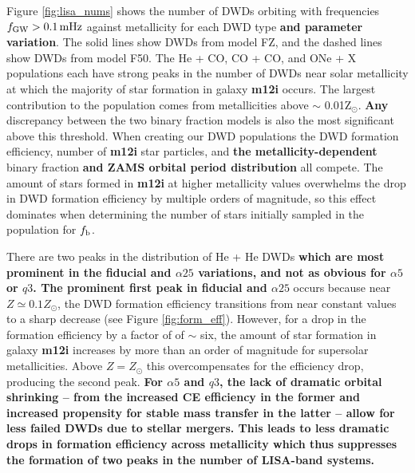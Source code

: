 \documentclass[twocolumn, linenumbers]{aastex631}
\begin{document}
Figure \ref{fig:lisa_nums} shows the number of DWDs orbiting with frequencies $f_{\rm{GW}} > 0.1\,\rm{mHz}$ against metallicity for each DWD type \textbf{and parameter variation}. The solid lines show DWDs from model FZ, and the dashed lines show DWDs from model F50. The He + CO, CO + CO, and ONe + X populations each have strong peaks in the number of DWDs near solar metallicity at which the majority of star formation in galaxy {\bf{m12i}} occurs. The largest contribution to the population comes from metallicities above $\sim$ 0.01Z$_\odot$. \textbf{Any} discrepancy between the two binary fraction models is also the most significant above this threshold. When creating our DWD populations the DWD formation efficiency, number of \textbf{m12i} star particles, and \textbf{the metallicity-dependent} binary fraction \textbf{and ZAMS orbital period distribution} all compete. The amount of stars formed in \textbf{m12i} at higher metallicity values overwhelms the drop in DWD formation efficiency by multiple orders of magnitude, so this effect dominates when determining the number of stars initially sampled in the population for $f_{\rm{b}}$. 

There are two peaks in the distribution of He + He DWDs \textbf{which are most prominent in the fiducial and $\alpha25$ variations, and not as obvious for $\alpha5$ or $q3$. The prominent first peak in fiducial and $\alpha25$} occurs because near $Z\simeq 0.1Z_\odot$, the DWD formation efficiency transitions from near constant values to a sharp decrease (see Figure \ref{fig:form_eff}). However, for a drop in the formation efficiency by a factor of of $\sim$ six, the amount of star formation in galaxy \textbf{m12i} increases by more than an order of magnitude for supersolar metallicities. Above $Z=Z_\odot$ this overcompensates for the efficiency drop, producing the second peak. \textbf{For $\alpha5$ and $q3$, the lack of dramatic orbital shrinking -- from the increased CE efficiency in the former and increased propensity for stable mass transfer in the latter -- allow for less failed DWDs due to stellar mergers. This leads to less dramatic drops in formation efficiency across metallicity which thus suppresses the formation of two peaks in the number of LISA-band systems.}
\end{document}
